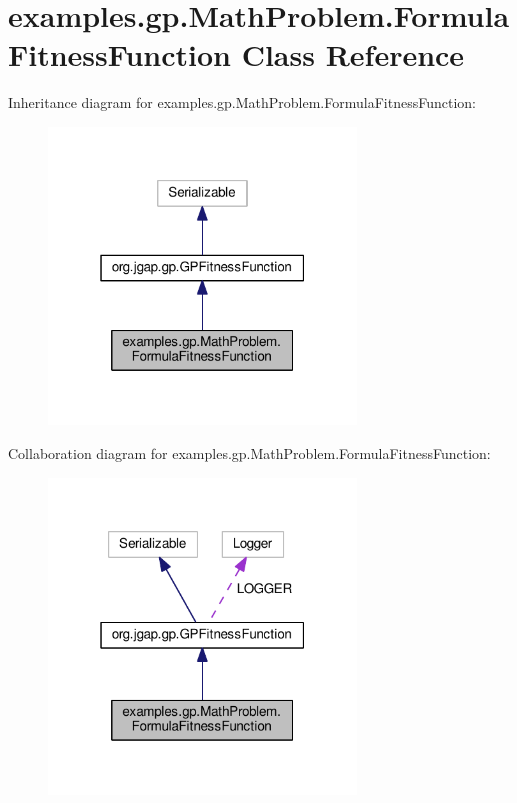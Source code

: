 \hypertarget{classexamples_1_1gp_1_1_math_problem_1_1_formula_fitness_function}{\section{examples.\-gp.\-Math\-Problem.\-Formula\-Fitness\-Function Class Reference}
\label{classexamples_1_1gp_1_1_math_problem_1_1_formula_fitness_function}
}


Inheritance diagram for examples.\-gp.\-Math\-Problem.\-Formula\-Fitness\-Function\-:
\nopagebreak
\begin{figure}[H]
\begin{center}
\leavevmode
\includegraphics[width=232pt]{classexamples_1_1gp_1_1_math_problem_1_1_formula_fitness_function__inherit__graph}
\end{center}
\end{figure}


Collaboration diagram for examples.\-gp.\-Math\-Problem.\-Formula\-Fitness\-Function\-:
\nopagebreak
\begin{figure}[H]
\begin{center}
\leavevmode
\includegraphics[width=232pt]{classexamples_1_1gp_1_1_math_problem_1_1_formula_fitness_function__coll__graph}
\end{center}
\end{figure}
